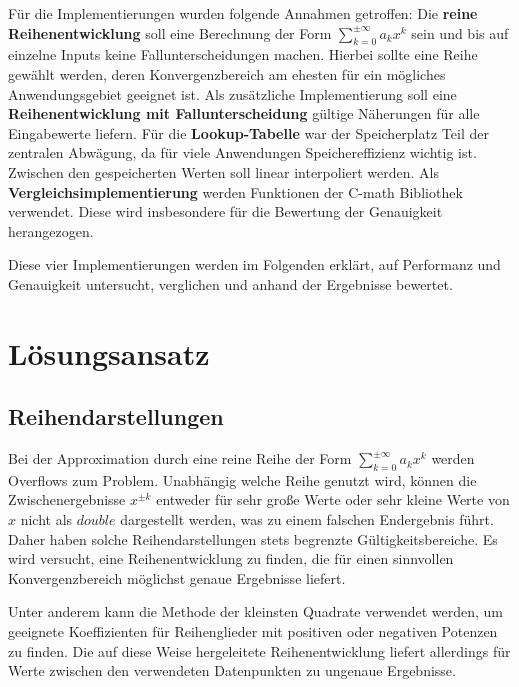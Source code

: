 \documentclass[course=erap] {aspdoc}
\begin{document}
    Für die Implementierungen wurden folgende Annahmen getroffen:
    Die \textbf{reine Reihenentwicklung} soll eine Berechnung der Form $\sum_{k=0}^{\pm\infty} a_k x^k$ sein und bis auf einzelne Inputs keine Fallunterscheidungen machen.
    Hierbei sollte eine Reihe gewählt werden, deren Konvergenzbereich am ehesten für ein mögliches Anwendungsgebiet geeignet ist.
    Als zusätzliche Implementierung soll eine \textbf{Reihenentwicklung mit Fallunterscheidung} gültige Näherungen für alle Eingabewerte liefern.
    Für die \textbf{Lookup-Tabelle} war der Speicherplatz Teil der zentralen Abwägung, da für viele Anwendungen Speichereffizienz wichtig ist.
    Zwischen den gespeicherten Werten soll linear interpoliert werden.
    Als \textbf{Vergleichsimplementierung} werden Funktionen der C-math Bibliothek verwendet.
    Diese wird insbesondere für die Bewertung der Genauigkeit herangezogen.

    Diese vier Implementierungen werden im Folgenden erklärt, auf Performanz und Genauigkeit untersucht, verglichen und anhand der Ergebnisse bewertet.


    \section{Lösungsansatz}\label{sec:losungsansatz}

    \subsection{Reihendarstellungen}\label{subsec:reihendarstellung}

    Bei der Approximation durch eine reine Reihe der Form $\sum_{k=0}^{\pm\infty} a_k x^k$ werden Overflows zum Problem.
    Unabhängig welche Reihe genutzt wird, können die Zwischenergebnisse $x^{\pm k}$ entweder für sehr große Werte oder sehr kleine Werte von $x$ nicht als $double$ dargestellt werden, was zu einem falschen Endergebnis führt.
    Daher haben solche Reihendarstellungen stets begrenzte Gültigkeitsbereiche.
    Es wird versucht, eine Reihenentwicklung zu finden, die für einen sinnvollen Konvergenzbereich möglichst genaue Ergebnisse liefert.

    Unter anderem kann die Methode der kleinsten Quadrate verwendet werden, um geeignete Koeffizienten für Reihenglieder mit positiven oder negativen Potenzen zu finden.
    Die auf diese Weise hergeleitete Reihenentwicklung liefert allerdings für Werte zwischen den verwendeten Datenpunkten zu ungenaue Ergebnisse.
\end{document}
